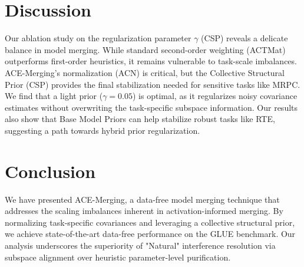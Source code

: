 \documentclass{article} %
\begin{document}
\section{Discussion}
Our ablation study on the regularization parameter $\gamma$ (CSP) reveals a delicate balance in model merging. While standard second-order weighting (ACTMat) outperforms first-order heuristics, it remains vulnerable to task-scale imbalances. ACE-Merging's normalization (ACN) is critical, but the Collective Structural Prior (CSP) provides the final stabilization needed for sensitive tasks like MRPC. We find that a light prior ($\gamma=0.05$) is optimal, as it regularizes noisy covariance estimates without overwriting the task-specific subspace information. Our results also show that Base Model Priors can help stabilize robust tasks like RTE, suggesting a path towards hybrid prior regularization.

\section{Conclusion}
We have presented ACE-Merging, a data-free model merging technique that addresses the scaling imbalances inherent in activation-informed merging. By normalizing task-specific covariances and leveraging a collective structural prior, we achieve state-of-the-art data-free performance on the GLUE benchmark. Our analysis underscores the superiority of "Natural" interference resolution via subspace alignment over heuristic parameter-level purification.



\end{document}
